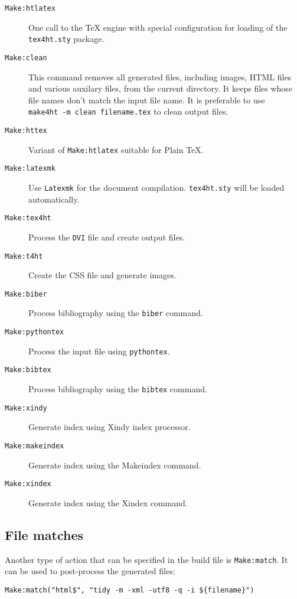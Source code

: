 \begin{description}
\item[\texttt{Make:htlatex}]
One call to the TeX engine with special configuration for loading of the
\texttt{tex4ht.sty} package.
\item[\texttt{Make:clean}]
This command removes all generated files, including images, HTML files
and various auxilary files, from the current directory. It keeps files
whose file names don't match the input file name. It is preferable to
use \texttt{make4ht\ -m\ clean\ filename.tex} to clean output files.
\item[\texttt{Make:httex}]
Variant of \texttt{Make:htlatex} suitable for Plain \TeX.
\item[\texttt{Make:latexmk}]
Use \texttt{Latexmk} for the document compilation. \texttt{tex4ht.sty}
will be loaded automatically.
\item[\texttt{Make:tex4ht}]
Process the \texttt{DVI} file and create output files.
\item[\texttt{Make:t4ht}]
Create the CSS file and generate images.
\item[\texttt{Make:biber}]
Process bibliography using the \texttt{biber} command.
\item[\texttt{Make:pythontex}]
Process the input file using \texttt{pythontex}.
\item[\texttt{Make:bibtex}]
Process bibliography using the \texttt{bibtex} command.
\item[\texttt{Make:xindy}]
Generate index using Xindy index processor.
\item[\texttt{Make:makeindex}]
Generate index using the Makeindex command.
\item[\texttt{Make:xindex}]
Generate index using the Xindex command.
\end{description}

\hypertarget{file-matches}{%
\subsection{File matches}\label{file-matches}}

\label{sec:postprocessing}

Another type of action that can be specified in the build file is
\texttt{Make:match}. It can be used to post-process the generated files:

\begin{verbatim}
Make:match("html$", "tidy -m -xml -utf8 -q -i ${filename}")
\end{verbatim}

